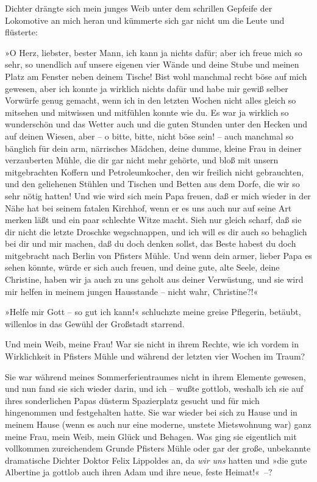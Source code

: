 Dichter drängte sich mein junges Weib unter dem schrillen Gepfeife
der Lokomotive an mich heran und kümmerte sich gar nicht um die
Leute und flüsterte:

»O Herz, liebster, bester Mann, ich kann ja nichts dafür; aber ich
freue mich so sehr, so unendlich auf unsere eigenen vier Wände und
deine Stube und meinen Platz am Fenster neben deinem Tische! Bist
wohl manchmal recht böse auf mich gewesen, aber ich konnte ja
wirklich nichts dafür und habe mir gewiß selber Vorwürfe genug
gemacht, wenn ich in den letzten Wochen nicht alles gleich so
mitsehen und mitwissen und mitfühlen konnte wie du. Es war ja
wirklich so wunderschön und das Wetter auch und die guten Stunden
unter den Hecken und auf deinen Wiesen, aber – o bitte, bitte,
nicht böse sein! – auch manchmal so bänglich für dein arm,
närrisches Mädchen, deine dumme, kleine Frau in deiner verzauberten
Mühle, die dir gar nicht mehr gehörte, und bloß mit unsern
mitgebrachten Koffern und Petroleumkocher, den wir freilich nicht
gebrauchten, und den geliehenen Stühlen und Tischen und Betten aus
dem Dorfe, die wir so sehr nötig hatten! Und wie wird sich mein
Papa freuen, daß er mich wieder in der Nähe hat bei seinem fatalen
Kirchhof, wenn er es uns auch nur auf seine Art merken läßt und ein
paar schlechte Witze macht. Sieh nur gleich scharf, daß sie dir
nicht die letzte Droschke wegschnappen, und ich will es dir auch so
behaglich bei dir und mir machen, daß du doch denken sollst, das
Beste habest du doch mitgebracht nach Berlin von Pfisters Mühle.
Und wenn dein armer, lieber Papa es sehen könnte, würde er sich
auch freuen, und deine gute, alte Seele, deine Christine, haben wir
ja auch zu uns geholt aus deiner Verwüstung, und sie wird mir
helfen in meinem jungen Hausstande – nicht wahr, Christine?!«

»Helfe mir Gott – so gut ich kann!« schluchzte meine greise
Pflegerin, betäubt, willenlos in das Gewühl der Großstadt
starrend.

Und mein Weib, meine Frau! War sie nicht in ihrem Rechte, wie ich
vordem in Wirklichkeit in Pfisters Mühle und während der letzten
vier Wochen im Traum?

Sie war während meines Sommerferientraumes nicht in ihrem Elemente
gewesen, und nun fand sie sich wieder darin, und ich – wußte
gottlob, weshalb ich sie auf ihres sonderlichen Papas düsterm
Spazierplatz gesucht und für mich hingenommen und festgehalten
hatte. Sie war wieder bei sich zu Hause und in meinem Hause (wenn
es auch nur eine moderne, unstete Mietswohnung war) ganz meine
Frau, mein Weib, mein Glück und Behagen. Was ging sie eigentlich
mit vollkommen zureichendem Grunde Pfisters Mühle oder gar der
große, unbekannte dramatische Dichter Doktor Felix Lippoldes an, da
\emph{wir uns} hatten und »die gute Albertine ja gottlob auch ihren
Adam und ihre neue, feste Heimat!«~–?

